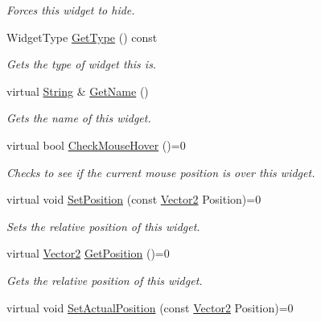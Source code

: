 \begin{DoxyCompactItemize}
\begin{DoxyCompactList}\small\item\em Forces this widget to hide. \item\end{DoxyCompactList}\item 
WidgetType \hyperlink{classphys_1_1UI_1_1Widget_a76337b279bd372ce225f94ab1da191ea}{GetType} () const 
\begin{DoxyCompactList}\small\item\em Gets the type of widget this is. \item\end{DoxyCompactList}\item 
virtual \hyperlink{namespacephys_aa03900411993de7fbfec4789bc1d392e}{String} \& \hyperlink{classphys_1_1UI_1_1Widget_a35d6e7ce60a9b295d8659345627cf7e0}{GetName} ()
\begin{DoxyCompactList}\small\item\em Gets the name of this widget. \item\end{DoxyCompactList}\item 
virtual bool \hyperlink{classphys_1_1UI_1_1Widget_a613df6dbb42efe139d185043a00259dc}{CheckMouseHover} ()=0
\begin{DoxyCompactList}\small\item\em Checks to see if the current mouse position is over this widget. \item\end{DoxyCompactList}\item 
virtual void \hyperlink{classphys_1_1UI_1_1Widget_a3f1cd1ce55660c7de4859983bac1ab7c}{SetPosition} (const \hyperlink{classphys_1_1Vector2}{Vector2} Position)=0
\begin{DoxyCompactList}\small\item\em Sets the relative position of this widget. \item\end{DoxyCompactList}\item 
virtual \hyperlink{classphys_1_1Vector2}{Vector2} \hyperlink{classphys_1_1UI_1_1Widget_a3e464b028b0d1b5755923b8790260c33}{GetPosition} ()=0
\begin{DoxyCompactList}\small\item\em Gets the relative position of this widget. \item\end{DoxyCompactList}\item 
virtual void \hyperlink{classphys_1_1UI_1_1Widget_acba334c000c21f477238e961cd3ab2ce}{SetActualPosition} (const \hyperlink{classphys_1_1Vector2}{Vector2} Position)=0

\end{DoxyCompactItemize}
